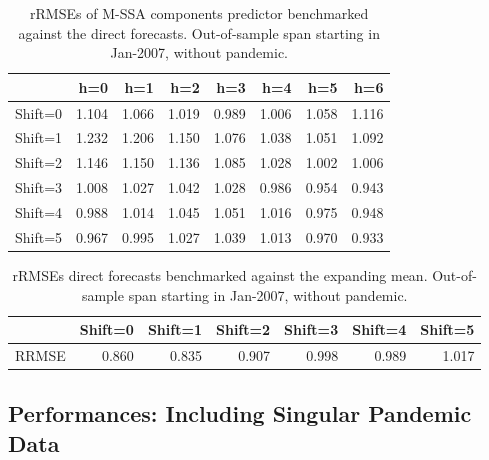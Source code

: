 \documentclass[a4paper]{article}
\begin{document}
\begin{table}[ht]
\centering
\begin{tabular}{rrrrrrrr}
  \hline
 & h=0 & h=1 & h=2 & h=3 & h=4 & h=5 & h=6 \\ 
  \hline
Shift=0 & 1.104 & 1.066 & 1.019 & 0.989 & 1.006 & 1.058 & 1.116 \\ 
  Shift=1 & 1.232 & 1.206 & 1.150 & 1.076 & 1.038 & 1.051 & 1.092 \\ 
  Shift=2 & 1.146 & 1.150 & 1.136 & 1.085 & 1.028 & 1.002 & 1.006 \\ 
  Shift=3 & 1.008 & 1.027 & 1.042 & 1.028 & 0.986 & 0.954 & 0.943 \\ 
  Shift=4 & 0.988 & 1.014 & 1.045 & 1.051 & 1.016 & 0.975 & 0.948 \\ 
  Shift=5 & 0.967 & 0.995 & 1.027 & 1.039 & 1.013 & 0.970 & 0.933 \\ 
   \hline
\end{tabular}
\caption{rRMSEs of M-SSA components predictor benchmarked against the direct forecasts. Out-of-sample span starting in Jan-2007, without pandemic.} 
\label{rRMSE_mSSA_comp_direct_without_covid7}
\end{table}%
\begin{table}[ht]
\centering
\begin{tabular}{rrrrrrr}
  \hline
 & Shift=0 & Shift=1 & Shift=2 & Shift=3 & Shift=4 & Shift=5 \\ 
  \hline
RRMSE & 0.860 & 0.835 & 0.907 & 0.998 & 0.989 & 1.017 \\ 
   \hline
\end{tabular}
\caption{rRMSEs direct forecasts benchmarked against the expanding mean. Out-of-sample span starting in Jan-2007, without pandemic.} 
\label{rRMSE_mSSA_direct_mean_without_covid8}
\end{table}

\newpage
\subsection{Performances: Including Singular Pandemic Data}
\end{document}

